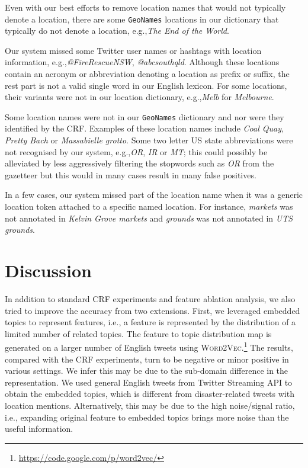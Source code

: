 \documentclass[11pt]{article}
\newcommand{\eg}{e.g.,\xspace}
\newcommand{\ie}{i.e.,\xspace}
\newcommand{\geoname}{\texttt{GeoNames}\xspace}
\newcommand{\myex}[1]{\textit{#1}}
\newcommand{\wordvec}{\textsc{Word2Vec}\xspace}
\newcommand{\myurl}[1]{{\footnotesize\url{#1}}}
\begin{document}
Even with our best efforts to remove location names that would not typically denote a location, there are some \geoname locations in our dictionary that typically do not denote a location, \eg \myex{The End of the World}.

Our system missed some Twitter user names or hashtags with location information, \eg \myex{@FireRescueNSW}, \myex{@abcsouthqld}.
Although these locations contain an acronym or abbreviation denoting a location as prefix or suffix, the rest part is not a valid single word in our English lexicon.
For some locations, their variants were not in our location dictionary, \eg \myex{Melb} for \myex{Melbourne}.

Some location names were not in our \geoname dictionary and nor were they identified by the CRF.
Examples of these location names include \myex{Coal Quay}, \myex{Pretty Bach} or \myex{Massabielle grotto}.
Some two letter US state abbreviations were not recognised by our system, \eg \myex{OR}, \myex{IR} or \myex{MT}; this could possibly be alleviated by less aggressively filtering the stopwords such as \myex{OR} from the gazetteer but this would in many cases result in many false positives.

In a few cases, our system missed part of the location name when it was a generic location token attached to a specific named location.
For instance, \myex{markets} was not annotated in \myex{Kelvin Grove markets} and \myex{grounds} was not annotated in \myex{UTS grounds}.

\section{Discussion}
\label{sec:discussion}

In addition to standard CRF experiments and feature ablation analysis, we also tried to improve the accuracy from two extensions.
First, we leveraged embedded topics to represent features, \ie a feature is represented by the distribution of a limited number of related topics.
The feature to topic distribution map is generated on a larger number of English tweets using \wordvec.\footnote{\myurl{https://code.google.com/p/word2vec/}}
The results, compared with the CRF experiments, turn to be negative or minor positive in various settings.
We infer this may be due to the sub-domain difference in the representation.
We used general English tweets from Twitter Streaming API to obtain the embedded topics, which is different from disaster-related tweets with location mentions.
Alternatively, this may be due to the high noise/signal ratio, \ie expanding original feature to embedded topics brings more noise than the useful information.
\end{document}

